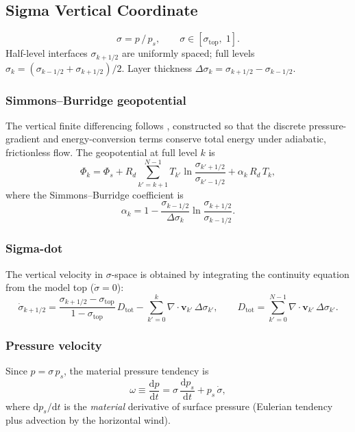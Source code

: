 \documentclass[11pt,a4paper]{article}
\newcommand{\dd}{\mathrm{d}}
\newcommand{\Rd}{R_d}
\begin{document}
\subsection{Sigma Vertical Coordinate}

\begin{equation}
  \sigma = p\,/\,p_s, \qquad \sigma\in[\sigma_{\mathrm{top}},\;1].
\end{equation}
Half-level interfaces $\sigma_{k+1/2}$ are uniformly spaced; full levels $\sigma_k=(\sigma_{k-1/2}+\sigma_{k+1/2})/2$.  Layer thickness $\Delta\sigma_k=\sigma_{k+1/2}-\sigma_{k-1/2}$.

\subsubsection{Simmons--Burridge geopotential}
The vertical finite differencing follows \citet{SimmonsBurridge1981}, constructed so that the discrete pressure-gradient and energy-conversion terms conserve total energy under adiabatic, frictionless flow.  The geopotential at full level $k$ is
\begin{equation}
  \Phi_k = \Phi_s + \Rd\!\sum_{k'=k+1}^{N-1}T_{k'}\ln\frac{\sigma_{k'+1/2}}{\sigma_{k'-1/2}}
  + \alpha_k\,\Rd\,T_k,
\end{equation}
where the Simmons--Burridge coefficient is
\begin{equation}
  \alpha_k = 1 - \frac{\sigma_{k-1/2}}{\Delta\sigma_k}\ln\frac{\sigma_{k+1/2}}{\sigma_{k-1/2}}.
\end{equation}

\subsubsection{Sigma-dot}
The vertical velocity in $\sigma$-space is obtained by integrating the continuity equation from the model top ($\dot\sigma=0$):
\begin{equation}
  \dot\sigma_{k+1/2} = \frac{\sigma_{k+1/2}-\sigma_{\mathrm{top}}}{1-\sigma_{\mathrm{top}}}\,D_{\mathrm{tot}} - \sum_{k'=0}^{k}\nabla\!\cdot\!\bm v_{k'}\,\Delta\sigma_{k'},
  \qquad D_{\mathrm{tot}}=\sum_{k'=0}^{N-1}\nabla\!\cdot\!\bm v_{k'}\,\Delta\sigma_{k'}.
\end{equation}

\subsubsection{Pressure velocity}
Since $p=\sigma\,p_s$, the material pressure tendency is
\begin{equation}
  \omega \equiv \frac{\dd p}{\dd t} = \sigma\,\frac{\dd p_s}{\dd t} + p_s\,\dot\sigma,
\end{equation}
where $\dd p_s/\dd t$ is the \emph{material} derivative of surface pressure (Eulerian tendency plus advection by the horizontal wind).
\end{document}
